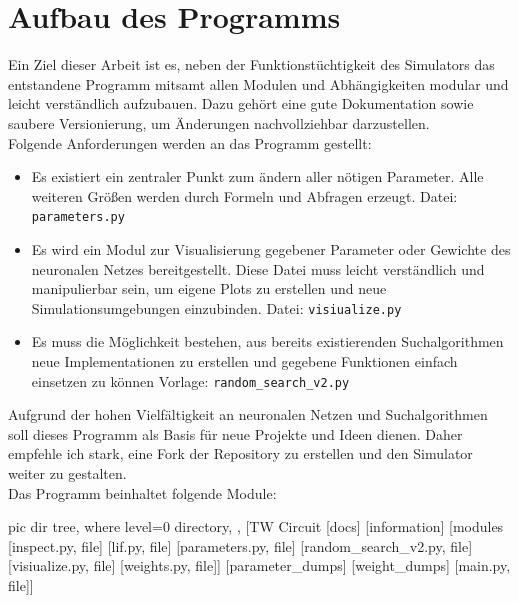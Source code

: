 \section{Aufbau des Programms}
\label{sec:imp_module}
	Ein Ziel dieser Arbeit ist es, neben der Funktionstüchtigkeit des Simulators das entstandene Programm mitsamt allen Modulen und Abhängigkeiten modular und leicht verständlich aufzubauen. Dazu gehört eine gute Dokumentation sowie saubere Versionierung, um Änderungen nachvollziehbar darzustellen.\\
	Folgende Anforderungen werden an das Programm gestellt:
	\begin{itemize}
		\item Es existiert ein zentraler Punkt zum ändern aller nötigen Parameter. Alle weiteren Größen werden durch Formeln und Abfragen erzeugt.
		\subitem Datei: \texttt{parameters.py}
		\item Es wird ein Modul zur Visualisierung gegebener Parameter oder Gewichte des neuronalen Netzes bereitgestellt. Diese Datei muss leicht verständlich und manipulierbar sein, um eigene Plots zu erstellen und neue Simulationsumgebungen einzubinden.
		\subitem Datei: \texttt{visiualize.py}
		\item Es muss die Möglichkeit bestehen, aus bereits existierenden Suchalgorithmen neue Implementationen zu erstellen und gegebene Funktionen einfach einsetzen zu können
		\subitem Vorlage: \texttt{random\_search\_v2.py}
	\end{itemize}
	Aufgrund der hohen Vielfältigkeit an neuronalen Netzen und Suchalgorithmen soll dieses Programm als Basis für neue Projekte und Ideen dienen. Daher empfehle ich stark, eine Fork der Repository \cite{BA} zu erstellen und den Simulator weiter zu gestalten.\\
	Das Programm beinhaltet folgende Module:\\
	\begin{minipage}{0.35\textwidth}
		\vspace{0.3cm}
		\begin{forest}
			pic dir tree,
			where level=0{}{%
				directory,
			},
			[TW Circuit
				[docs]
				[information]
				[modules
					[inspect.py, file]
					[lif.py, file]
					[parameters.py, file]
					[random\_search\_v2.py, file]
					[visiualize.py, file]
					[weights.py, file]]
				[parameter\_dumps]
				[weight\_dumps]
				[main.py, file]]
		\end{forest}
	\end{minipage}
